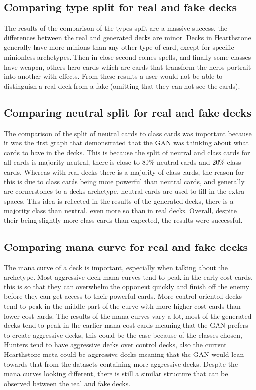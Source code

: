 \documentclass{report} %
\begin{document}
\subsection{Comparing type split for real and fake decks}
The results of the comparison of the types split are a massive success, the differences between the real and generated decks are minor. Decks in Hearthstone generally have more minions than any other type of card, except for specific minionless archetypes. Then in close second comes spells, and finally some classes have weapon, others hero cards which are cards that transform the heros portrait into another with effects. From these results a user would not be able to distinguish a real deck from a fake (omitting that they can not see the cards).
\subsection{Comparing neutral split for real and fake decks}
The comparison of the split of neutral cards to class cards was important because it was the first graph that demonstrated that the GAN was thinking about what cards to have in the decks. This is because the split of neutral and class cards for all cards is majority neutral, there is close to 80\% neutral cards and 20\% class cards. Whereas with real decks there is a majority of class cards, the reason for this is due to class cards being more powerful than neutral cards, and generally are cornerstones to a decks archetype, neutral cards are used to fill in the extra spaces. This idea is reflected in the results of the generated decks, there is a majority class than neutral, even more so than in real decks. Overall, despite their being slightly more class cards than expected, the results were successful.
\subsection{Comparing mana curve for real and fake decks}
The mana curve of a deck is important, especially when talking about the archetype. Most aggressive deck mana curves tend to peak in the early cost cards, this is so that they can overwhelm the opponent quickly and finish off the enemy before they can get access to their powerful cards. More control oriented decks tend to peak in the middle part of the curve with more higher cost cards than lower cost cards. The results of the mana curves vary a lot, most of the generated decks tend to peak in the earlier mana cost cards meaning that the GAN prefers to create aggressive decks, this could be the case because of the classes chosen, Hunters tend to have aggressive decks over control decks, also the current Hearthstone meta could be aggressive decks meaning that the GAN would lean towards that from the datasets containing more aggressive decks. Despite the mana curves looking different, there is still a similar structure that can be observed between the real and fake decks. 
\end{document}
